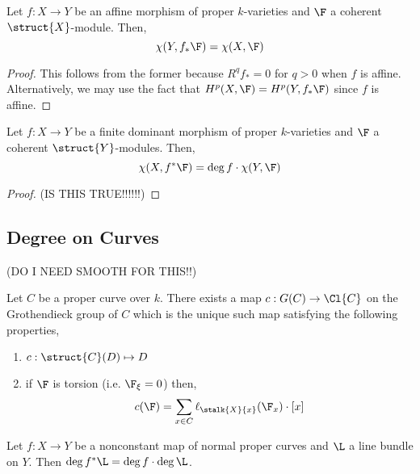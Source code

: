\documentclass[12pt]{article}
\begin{document}
\begin{cor}
Let $f : X \to Y$ be an affine morphism of proper $k$-varieties and $\F$ a coherent $\struct{X}$-module. Then,
\[ \chi(Y, f_* \F) = \chi(X, \F) \]
\end{cor}

\begin{proof}
This follows from the former because $R^q f_* = 0$ for $q > 0$ when $f$ is affine. Alternatively, we may use the fact that $H^p(X, \F) = H^p(Y, f_* \F)$ since $f$ is affine.
\end{proof}

\begin{lemma}

\end{lemma}

\begin{lemma}
Let $f : X \to Y$ be a finite dominant \etale morphism of proper $k$-varieties and $\F$ a coherent $\struct{Y}$-modules. Then,
\[ \chi(X, f^* \F) = \deg{f} \cdot \chi(Y, \F) \]
\end{lemma}

\begin{proof}
(IS THIS TRUE!!!!!!)
\end{proof}

\subsection{Degree on Curves}

(DO I NEED SMOOTH FOR THIS!!)
\begin{prop}
Let $C$ be a proper curve over $k$. There exists a map $c : G(C) \to \Cl{C}$ on the Grothendieck group of $C$ which is the unique such map satisfying the following properties,
\begin{enumerate}
\item $c : \struct{C}(D) \mapsto D$
\item if $\F$ is torsion (i.e. $\F_\xi = 0$) then,
\[ c(\F) = \sum_{x \in C} \ell_{\stalk{X}{x}}(\F_x) \cdot [x] \]
\end{enumerate}
\end{prop}



\begin{lemma}

\end{lemma}

\begin{prop}
Let $f : X \to Y$ be a nonconstant map of normal proper curves and $\L$ a line bundle on $Y$. Then $\deg{f^* \L} = \deg{f} \cdot \deg{\L}$.
\end{prop}
\end{document}
